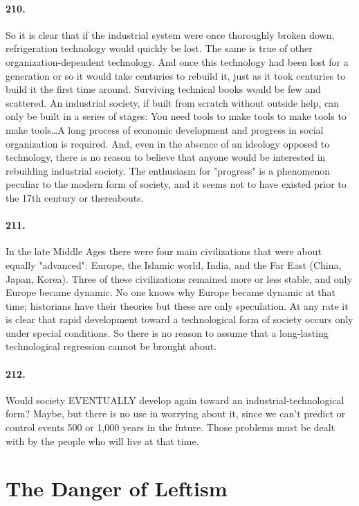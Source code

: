 \documentclass[12pt]{book}
\newcommand{\mysection}[1]{\section*{#1} \addcontentsline{toc}{section}{#1}}
\begin{document}
\paragraph{210.}  So it is clear that if the industrial system were once thoroughly broken down, refrigeration technology would quickly be lost. The same is true of other organization-dependent technology. And once this technology had been lost for a generation or so it would take centuries to rebuild it, just as it took centuries to build it the first time around.  Surviving technical books would be few and scattered. An industrial society, if built from scratch without outside help, can only be built in a series of stages: You need tools to make tools to make tools to make tools\dots{}A long process of economic development and progress in social organization is required. And, even in the absence of an ideology opposed to technology, there is no reason to believe that anyone would be interested in rebuilding industrial society. The enthusiasm for "progress" is a phenomenon peculiar to the modern form of society, and it seems not to have existed prior to the 17th century or thereabouts.


\paragraph{211.}  In the late Middle Ages there were four main civilizations that were about equally "advanced": Europe, the Islamic world, India, and the Far East (China, Japan, Korea). Three of these civilizations remained more or less stable, and only Europe became dynamic. No one knows why Europe became dynamic at that time; historians have their theories but these are only speculation. At any rate it is clear that rapid development toward a technological form of society occurs only under special conditions. So there is no reason to assume that a long-lasting technological regression cannot be brought about.


\paragraph{212.} Would society EVENTUALLY develop again toward an industrial-technological form? Maybe, but there is no use in worrying about it, since we can't predict or control events 500 or 1,000 years in the future. Those problems must be dealt with by the people who will live at that time.

\mysection{The Danger of Leftism}
\end{document}
